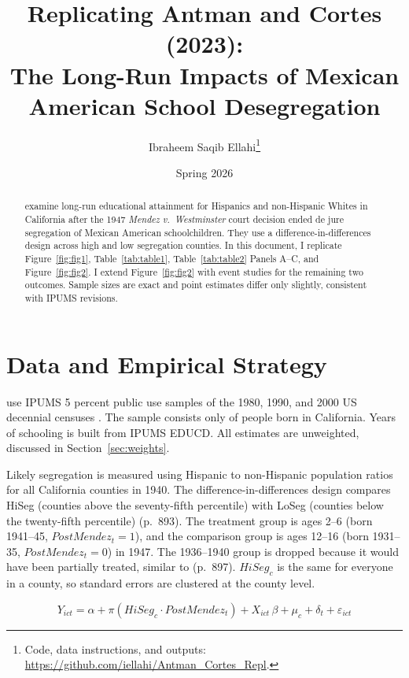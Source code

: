 \documentclass[11pt]{article}
\title{Replicating Antman and Cortes (2023):\\
The Long-Run Impacts of Mexican American School Desegregation}
\author{Ibraheem Saqib Ellahi\thanks{Code, data instructions, and outputs: \url{https://github.com/iellahi/Antman_Cortes_Repl}.}}
\date{Spring 2026}
\begin{document}
\maketitle

\begin{abstract}

\cite{antmancortes2023} examine long-run educational attainment for
Hispanics and non-Hispanic Whites in California after the 1947 \textit{Mendez v.\ Westminster} court decision ended de jure segregation of Mexican American schoolchildren. They use a difference-in-differences design across high and low segregation counties. In this document, I replicate Figure~\ref{fig:fig1}, Table~\ref{tab:table1}, Table~\ref{tab:table2} Panels A--C, and Figure~\ref{fig:fig2}. I extend Figure~\ref{fig:fig2} with event studies for the remaining two outcomes. Sample sizes are exact and point estimates differ only slightly, consistent with IPUMS revisions.

\end{abstract}

\section{Data and Empirical Strategy}
\label{sec:strategy}

\cite[p.~892]{antmancortes2023} use IPUMS 5 percent public use samples of the 1980, 1990, and 2000 US decennial censuses \citep{ipumsusa}. The sample consists only of people born in California. Years of schooling is built from IPUMS EDUCD. All estimates are unweighted, discussed in Section~\ref{sec:weights}.

Likely segregation is measured using Hispanic to non-Hispanic population ratios for all California counties in 1940. The difference-in-differences design compares HiSeg (counties above the seventy-fifth percentile) with LoSeg (counties below the twenty-fifth percentile) (p.~893). The treatment group is ages 2--6 (born 1941--45, $PostMendez_t=1$), and the comparison group is ages 12--16 (born 1931--35, $PostMendez_t=0$) in 1947. The 1936--1940 group is dropped because it would have been partially treated, similar to \cite{duflo2001} (p.~897). $HiSeg_c$ is the same for everyone in a county, so standard errors are clustered at the county level.

\begin{equation}
\label{eq:did}
Y_{ict} = \alpha + \pi \left( HiSeg_c \cdot PostMendez_t \right)
          + X_{ict}\,\beta + \mu_c + \delta_t + \varepsilon_{ict}
\end{equation}
\end{document}
